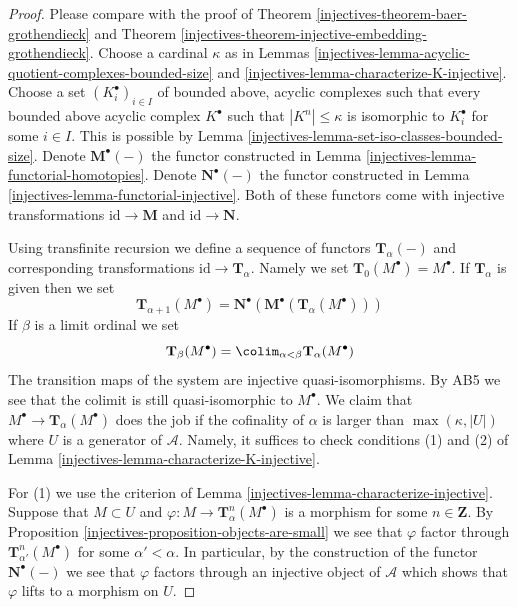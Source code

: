 \begin{proof}

Please compare with the proof of
Theorem \ref{injectives-theorem-baer-grothendieck}
and
Theorem \ref{injectives-theorem-injective-embedding-grothendieck}.
Choose a cardinal $\kappa$ as in
Lemmas \ref{injectives-lemma-acyclic-quotient-complexes-bounded-size} and
\ref{injectives-lemma-characterize-K-injective}.
Choose a set $(K_i^\bullet)_{i \in I}$
of bounded above, acyclic complexes
such that every bounded above acyclic complex $K^\bullet$
such that $|K^n| \leq \kappa$ is isomorphic to $K_i^\bullet$ for some
$i \in I$. This is possible by
Lemma \ref{injectives-lemma-set-iso-classes-bounded-size}.
Denote $\mathbf{M}^\bullet(-)$ the functor constructed in
Lemma \ref{injectives-lemma-functorial-homotopies}.
Denote $\mathbf{N}^\bullet(-)$ the functor constructed in
Lemma \ref{injectives-lemma-functorial-injective}.
Both of these functors come with injective transformations
$\text{id} \to \mathbf{M}$ and $\text{id} \to \mathbf{N}$.

\medskip\noindent
Using transfinite recursion we define a sequence of functors
$\mathbf{T}_\alpha(-)$ and corresponding transformations
$\text{id} \to \mathbf{T}_\alpha$. Namely we set
$\mathbf{T}_0(M^\bullet) = M^\bullet$. If $\mathbf{T}_\alpha$ is
given then we set
$$
\mathbf{T}_{\alpha + 1}(M^\bullet) =
\mathbf{N}^\bullet(\mathbf{M}^\bullet(\mathbf{T}_\alpha(M^\bullet)))
$$
If $\beta$ is a limit ordinal we set
$$
\mathbf{T}_\beta(M^\bullet) =
\colim_{\alpha < \beta} \mathbf{T}_\alpha(M^\bullet)
$$
The transition maps of the system are injective quasi-isomorphisms.
By AB5 we see that the colimit is still quasi-isomorphic to $M^\bullet$.
We claim that $M^\bullet \to \mathbf{T}_\alpha(M^\bullet)$
does the job if the cofinality of $\alpha$ is larger than
$\max(\kappa, |U|)$ where $U$ is a generator of $\mathcal{A}$.
Namely, it suffices to check conditions (1) and (2) of
Lemma \ref{injectives-lemma-characterize-K-injective}.

\medskip\noindent
For (1) we use the criterion of
Lemma \ref{injectives-lemma-characterize-injective}.
Suppose that $M \subset U$ and $\varphi : M \to \mathbf{T}^n_\alpha(M^\bullet)$
is a morphism for some $n \in \mathbf{Z}$. By
Proposition \ref{injectives-proposition-objects-are-small}
we see that $\varphi$ factor through
$\mathbf{T}^n_{\alpha'}(M^\bullet)$ for some $\alpha' < \alpha$.
In particular, by the construction of the functor
$\mathbf{N}^\bullet(-)$ we see that $\varphi$ factors through
an injective object of $\mathcal{A}$ which shows that $\varphi$
lifts to a morphism on $U$.


\end{proof}
